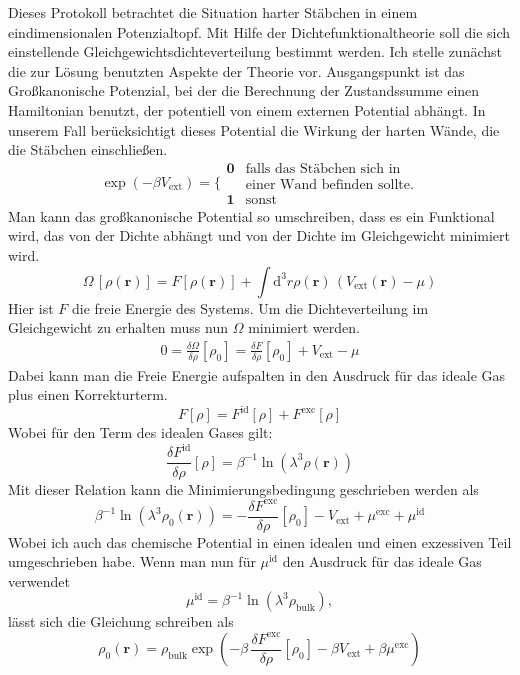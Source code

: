 \documentclass[12pt]{article}
\begin{document}
Dieses Protokoll betrachtet die Situation harter Stäbchen in einem eindimensionalen Potenzialtopf. Mit Hilfe der Dichtefunktionaltheorie soll die sich einstellende Gleichgewichtsdichteverteilung bestimmt werden. Ich stelle zunächst die zur Lösung benutzten Aspekte der Theorie vor. Ausgangspunkt ist das Großkanonische Potenzial, bei der die Berechnung der Zustandssumme einen Hamiltonian benutzt, der potentiell von einem externen Potential abhängt. In unserem Fall berücksichtigt dieses Potential die Wirkung der harten Wände, die die Stäbchen einschließen.
$$\exp(-\beta{V_\text{ext}})=\Biggl\{\begin{array}{ll}\textbf{0}&\text{falls das Stäbchen sich in}\\
 &\text{einer Wand befinden sollte.}\\
\textbf{1}&\text{sonst}\end{array}$$ 
Man kann das großkanonische Potential so umschreiben, dass es ein Funktional wird, das von der Dichte abhängt und von der Dichte im Gleichgewicht minimiert wird.
\begin{equation}\Omega\,[\rho(\textbf{r})]=F[\rho(\textbf{r})]+\int\text{d}^3r\rho(\textbf{r})\,(V_\text{ext}(\textbf{r})-\mu)\end{equation}
Hier ist $F$ die freie Energie des Systems. Um die Dichteverteilung im Gleichgewicht zu erhalten muss nun $\Omega$ minimiert werden.
\begin{gather*}0=\frac{\delta\Omega}{\delta\rho}[\rho_0]=\frac{\delta{F}}{\delta\rho}[\rho_0]+V_\text{ext}-\mu\end{gather*}
Dabei kann man die Freie Energie aufspalten in den Ausdruck für das ideale Gas plus einen Korrekturterm.
$$F[\rho]=F^\text{id}[\rho]+F^\text{exc}[\rho]$$
Wobei für den Term des idealen Gases gilt:
$$\frac{\delta{F^\text{id}}}{\delta\rho}[\rho]=\beta^{-1}\ln(\lambda^3\rho(\textbf{r}))$$
Mit dieser Relation kann die Minimierungsbedingung geschrieben werden als
\begin{equation}\beta^{-1}\ln(\lambda^3\rho_0(\textbf{r}))=-\frac{\delta{F^\text{exc}}}{\delta\rho}[\rho_0]-V_\text{ext}+\mu^\text{exc}+\mu^\text{id}\end{equation}
Wobei ich auch das chemische Potential in einen idealen und einen exzessiven Teil umgeschrieben habe.
Wenn man nun für $\mu^\text{id}$ den Ausdruck für das ideale Gas verwendet
$$\mu^\text{id}=\beta^{-1}\ln(\lambda^3\rho_\text{bulk}),$$
lässt sich die Gleichung schreiben als
\begin{equation}\rho_0(\textbf{r})=\rho_\text{bulk}\exp\left(-\beta\,\frac{\delta{F^\text{exc}}}{\delta\rho}[\rho_0]-\beta{V_\text{ext}+\beta\mu^\text{exc}}\right)\end{equation}
\end{document}
